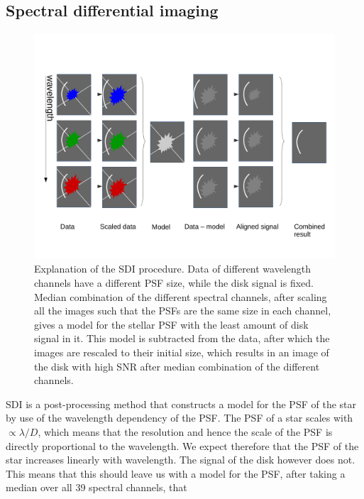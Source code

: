 \documentclass[twoside,single,12pt]{lion-msc}
\begin{document}
\subsection{Spectral differential imaging}
\begin{figure}[h]
\centering 
\includegraphics[trim={0cm 1cm 0cm 3cm},clip,width = \textwidth]{sdiexplanation}
\caption{Explanation of the SDI procedure. Data of different wavelength channels have a different PSF size, while the disk signal is fixed. Median combination of the different spectral channels, after scaling all the images such that the PSFs are the same size in each channel, gives a model for the stellar PSF with the least amount of disk signal in it. This model is subtracted from the data, after which the images are rescaled to their initial size, which results in an image of the disk with high SNR after median combination of the different channels.} 
\label{fig:sdiexplanation}
\end{figure}

SDI is a post-processing method that constructs a model for the PSF of the star by use of the wavelength dependency of the PSF. The PSF of a star scales with $ \propto\lambda/D$, which means that the resolution and hence the scale of the PSF is directly proportional to the wavelength. We expect therefore that the PSF of the star increases linearly with wavelength. The signal of the disk however does not. This means that this should leave us with a model for the PSF, after taking a median over all 39 spectral channels, that {\par}
\end{document}
